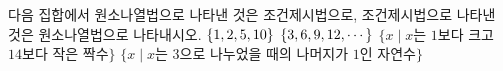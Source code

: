 다음 집합에서 원소나열법으로 나타낸 것은 조건제시법으로, 조건제시법으로 나타낸 것은 원소나열법으로 나타내시오.
 $\{1{,}\mkern3mu\mathopen{}2{,}\mkern3mu\mathopen{}5{,}\mkern3mu\mathopen{}10\}$
 $\{3{,}\mkern3mu\mathopen{}6{,}\mkern3mu\mathopen{}9{,}\mkern3mu\mathopen{}12{,}\mkern3mu\mathopen{}\cdots\}$
 $\{x \mid x$는 $1$보다 크고 $14$보다 작은 짝수$\}$
 $\{x \mid x$는 $3$으로 나누었을 때의 나머지가 $1$인 자연수$\}$
